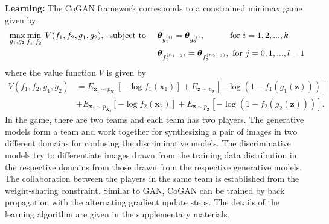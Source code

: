 {\bf Learning: }
The CoGAN framework corresponds to a constrained minimax game given by
\begin{align}
 \max_{g_1,g_2} \min_{f_1,f_2} \medspace V(f_1,f_2,g_1,g_2), \medspace \text{ subject to }\quad 
&\text{\boldmath$\theta$}_{g_1^{(i)}}=\text{\boldmath$\theta$}_{g_2^{(i)}}, \quad\quad\quad\text{for $i=1,2,...,k$} \quad \\
&\text{\boldmath$\theta$}_{f_1^{(n_1-j)}}=\text{\boldmath$\theta$}_{f_2^{(n_2-j)}}, \space\space\text{ for $j=0,1,...,l-1$} \nonumber
\end{align}
where the value function $V$ is given by 
\begin{align}
V(f_1,f_2,g_1,g_2) &= E_{ \mathbf{x}_1 \sim p_{\mathbf{X}_1}} [ - \log f_1(\mathbf{x}_1) ] + E_{\mathbf{z}\sim p_{\mathbf{Z}}} [ - \log( 1 - f_1(g_1(\mathbf{z}))) ]\nonumber\\
& + E_{ \mathbf{x}_2 \sim p_{\mathbf{X}_2}} [ - \log f_2(\mathbf{x}_2) ]+ E_{\mathbf{z}\sim p_{\mathbf{Z}}} [ - \log( 1 - f_2(g_2(\mathbf{z}))) ].
\end{align}
In the game, there are two teams and each team has two players. The generative models form a team and work together for synthesizing a pair of images in two different domains for confusing the discriminative models. The discriminative models try to differentiate images drawn from the training data distribution in the respective domains from those drawn from the respective generative models. The collaboration between the players in the same team is established from the weight-sharing constraint. Similar to GAN, CoGAN can be trained by back propagation with the alternating gradient update steps. The details of the learning algorithm are given in the supplementary materials.

